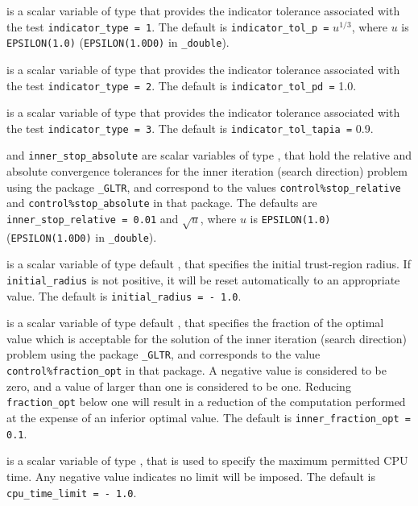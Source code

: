 \begin{description}
is a scalar variable of type \realdp that
provides the indicator tolerance associated with the test
{\tt indicator\_type = 1}.
The default is {\tt indicator\-\_tol\_p =} $u^{1/3}$,
where $u$ is {\tt EPSILON(1.0)} ({\tt EPSILON(1.0D0)} in 
{\tt \fullpackagename\_double}).

is a scalar variable of type \realdp that
provides the indicator tolerance associated with the test
{\tt indicator\_type = 2}.
The default is {\tt indicator\-\_tol\_pd =} 1.0.

is a scalar variable of type \realdp that
provides the indicator tolerance associated with the test
{\tt indicator\_type = 3}.
The default is {\tt indicator\-\_tol\_tapia =} 0.9.

 and {\tt inner\_stop\_absolute} 
are scalar variables of type \realdp, 
that hold the relative and absolute convergence tolerances for the
inner iteration (search direction) problem using the package 
{\tt \libraryname\_GLTR},
and correspond to the values {\tt control\%stop\_relative} and
{\tt control\%stop\_absolute} in that package.
The defaults are 
{\tt inner\_stop\_relative = 0.01}
and  $\sqrt{u}$,
where $u$ is {\tt EPSILON(1.0)} ({\tt EPSILON(1.0D0)} in 
{\tt \fullpackagename\_double}).

 is a scalar variable of type default 
\realdp, that specifies the initial trust-region radius. 
If {\tt initial\_radius} is
not positive, it will be reset automatically to an appropriate value.
The default is {\tt initial\_radius = - 1.0}.

 is a scalar variable of type default 
\realdp, that specifies the
fraction of the optimal value which is acceptable for the solution of the
inner iteration (search direction) problem using the package 
{\tt \libraryname\_GLTR}, 
and corresponds to the value {\tt control\%fraction\_opt} in that package.
A negative value is considered to be zero, and a value of larger than one
is considered to be one. Reducing {\tt fraction\_opt} below one will result
in a reduction of the computation performed at the expense of an inferior
optimal value.
The default is {\tt inner\_fraction\_opt = 0.1}.

 is a scalar variable of type \realdp, 
that is used to specify the maximum permitted CPU time. Any negative
value indicates no limit will be imposed. The default is 
{\tt cpu\_time\_limit = - 1.0}.


\end{description}
